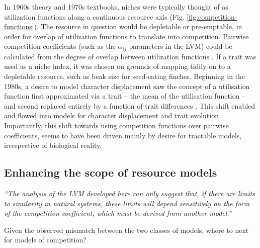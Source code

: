 \documentclass[a4paper,11pt]{article}
\begin{document}
In 1960s theory and 1970s textbooks, niches were typically thought of as utilization functions along a continuous resource axis \citep{MacArthur-1967,Abrams-1975} (Fig. \ref{fig:competition-functions}). The resource in question would be depletable or pre-emptable, in order for overlap of utilization functions to translate into competition. Pairwise competition coefficients (such as the $\alpha_{ij}$ parameters in the LVM) could be calculated from the degree of overlap between utilization functions \citep{MacArthur-1967, May-1972, Abrams-1975}. If a trait was used as a niche index, it was chosen on grounds of mapping tidily on to a depletable resource, such as beak size for seed-eating finches. Beginning in the 1980s, a desire to model character displacement saw the concept of a utilisation function first approximated via a trait -- the mean of the utilisation function \citep{Roughgarden-1979} -- and second replaced entirely by a function of trait differences \citep{Slatkin-1980,Taper-1985}. This shift enabled and flowed into models for character displacement \citep[e.g.,][]{Taper-1985, Case-2000, Goldberg-2006} and trait evolution \citep{Brown-1987, Geritz-1998, Geritz-1999, Dieckmann-1999, Abrams-2001}. Importantly, this shift towards using competition functions over pairwise coefficients, seems to have been driven mainly by desire for tractable models, irrespective of biological reality.

\subsection{Enhancing the scope of resource models}

\emph{``The analysis of the LVM developed here can only suggest that, if there are limits to similarity in natural systems, these limits will depend sensitively on the form of the competition coefficient, which must be derived from another model.''}\citep{Abrams-1975}

Given the observed mismatch between the two classes of models, where to next for models of competition?
\end{document}

